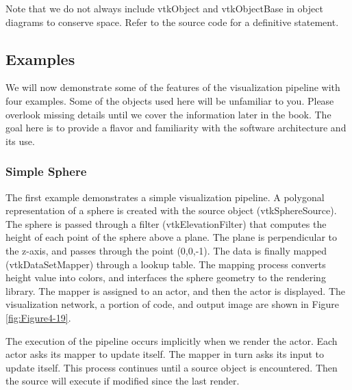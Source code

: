 Note that we do not always include vtkObject and vtkObjectBase in object diagrams to conserve space. Refer to the source code for a definitive statement.

\subsection{Examples}
\label{subsec:Ch04Examples}

We will now demonstrate some of the features of the visualization pipeline with four examples. Some of the objects used here will be unfamiliar to you. Please overlook missing details until we cover the information later in the book. The goal here is to provide a flavor and familiarity with the software architecture and its use.

\subsubsection{Simple Sphere}
\label{subsubsec:simple_sphere}

The first example demonstrates a simple visualization pipeline. A polygonal representation of a sphere is created with the source object (vtkSphereSource). The sphere is passed through a filter (vtkElevationFilter) that computes the height of each point of the sphere above a plane. The plane is perpendicular to the z-axis, and passes through the point (0,0,-1). The data is finally mapped (vtkDataSetMapper) through a lookup table. The mapping process converts height value into colors, and interfaces the sphere geometry to the rendering library. The mapper is assigned to an actor, and then the actor is displayed. The visualization network, a portion of code, and output image are shown in Figure \ref{fig:Figure4-19}.

The execution of the pipeline occurs implicitly when we render the actor. Each actor asks its mapper to update itself. The mapper in turn asks its input to update itself. This process continues until a source object is encountered. Then the source will execute if modified since the last render.

